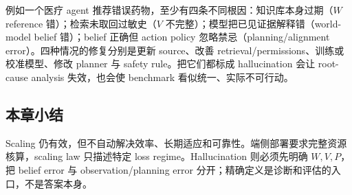 例如一个医疗 agent 推荐错误药物，至少有四条不同根因：知识库本身过期（$W$ reference 错）；检索未取回过敏史（$V$ 不完整）；模型把已见证据解释错（world-model belief 错）；belief 正确但 action policy 忽略禁忌（planning/alignment error）。四种情况的修复分别是更新 source、改善 retrieval/permissions、训练或校准模型、修改 planner 与 safety rule。把它们都标成 hallucination 会让 root-cause analysis 失效，也会使 benchmark 看似统一、实际不可行动。

\subsection{本章小结}

Scaling 仍有效，但不自动解决效率、长期适应和可靠性。端侧部署要求完整资源核算，scaling law 只描述特定 loss regime。Hallucination 则必须先明确 $W,V,P$，把 belief error 与 observation/planning error 分开；精确定义是诊断和评估的入口，不是答案本身。

